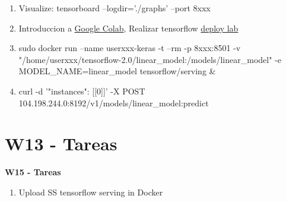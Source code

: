 \documentclass{beamer}
\begin{document}
\begin{frame}
\begin{enumerate}
\item Visualize:  tensorboard --logdir='./graphs' --port 8xxx
 
\item Introduccion a \href{https://www.adictosaltrabajo.com/2019/06/04/google-colab-python-y-machine-learning-en-la-nube/}{Google Colab}, Realizar tensorflow  \href{https://towardsdatascience.com/serving-keras-models-locally-using-tensorflow-serving-tf-2-x-8bb8474c304e}{deploy lab}
\item sudo docker run --name userxxx-keras -t --rm -p 8xxx:8501 -v "/home/userxxx/tensorflow-2.0/linear\_model:/models/linear\_model" -e MODEL\_NAME=linear\_model tensorflow/serving \&

\item curl -d '{"instances": [[0]]}' -X POST 104.198.244.0:8192/v1/models/linear\_model:predict 
\end{enumerate}


\end{frame}


\section{W13  - Tareas }

\begin{frame}


\textbf{W15  - Tareas}


\begin{enumerate}

\item
  Upload SS tensorflow serving in Docker

 	
\end{enumerate} 


\end{frame}
\end{document}
